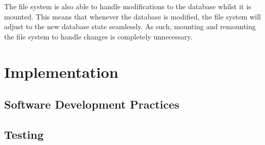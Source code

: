 The file system is also able to handle modifications to the database whilst it
is mounted. This means that whenever the database is modified, the file system
will adjust to the new database state seamlessly. As such, mounting and
remounting the file system to handle changes is completely unnecessary.

\section{Implementation}

\subsection{Software Development Practices}

\subsection{Testing}
